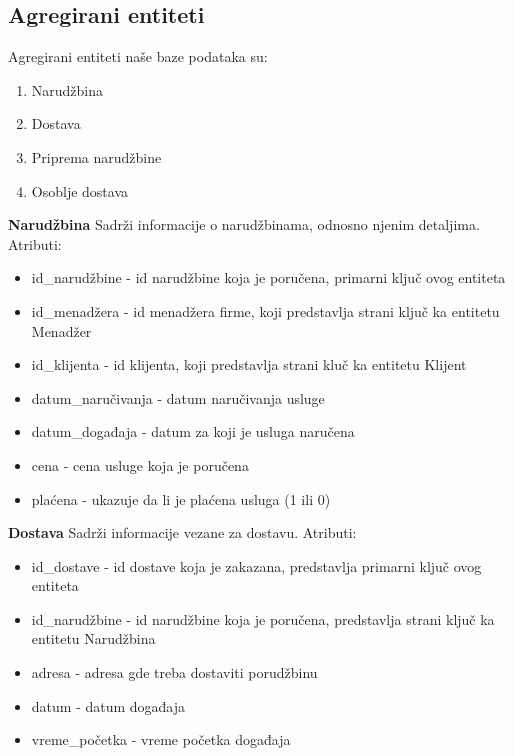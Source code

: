 \documentclass[a4paper]{article}
\begin{document}
\subsection{Agregirani entiteti}

Agregirani entiteti naše baze podataka su:
\begin{enumerate}
    \item Narudžbina
    \item Dostava
    \item Priprema narudžbine
    \item Osoblje dostava
\end{enumerate}


\vspace{3mm}

\textbf{Narudžbina} Sadrži informacije o narudžbinama, odnosno njenim detaljima. Atributi:
\begin{itemize}
    \item id\_narudžbine - id narudžbine koja je poručena, primarni ključ ovog entiteta
    \item id\_menadžera - id menadžera firme, koji predstavlja strani ključ ka entitetu Menadžer
    \item id\_klijenta - id klijenta, koji predstavlja strani kluč ka entitetu Klijent
    \item datum\_naručivanja - datum naručivanja usluge
    \item datum\_događaja - datum za koji je usluga naručena
    \item cena - cena usluge koja je poručena
    \item plaćena - ukazuje da li je plaćena usluga (1 ili 0)
    
\end{itemize}

\vspace{3mm}



\textbf{Dostava} Sadrži informacije vezane za dostavu. Atributi:
\begin{itemize}
    \item id\_dostave - id dostave koja je zakazana, predstavlja primarni ključ ovog entiteta
    \item id\_narudžbine - id narudžbine koja je poručena, predstavlja strani ključ ka entitetu Narudžbina
    \item adresa - adresa gde treba dostaviti porudžbinu
    \item datum - datum događaja
    \item vreme\_početka - vreme početka događaja
    
\end{itemize}
\end{document}
